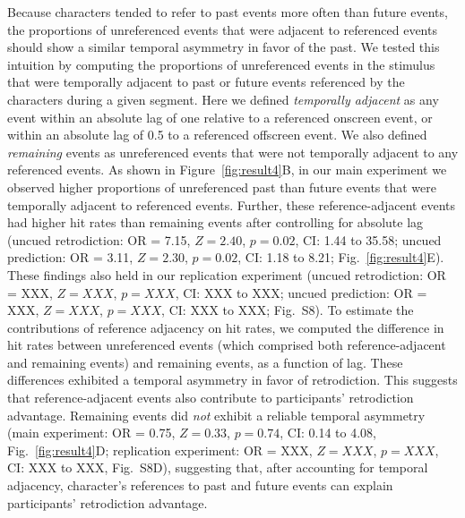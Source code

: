 \documentclass[10pt]{article}
\newcommand{\refAdjacent}{S8}
\begin{document}
Because characters tended to refer to past events more often than future events, the proportions of unreferenced events that were adjacent to referenced events should show a similar temporal asymmetry in favor of the past. We tested this intuition by computing the proportions of unreferenced events in the stimulus that were temporally adjacent to past or future events referenced by the characters during a given segment. Here we defined \textit{temporally adjacent} as any event within an absolute lag of one relative to a referenced onscreen event, or within an absolute lag of 0.5 to a referenced offscreen event. We also defined \textit{remaining} events as unreferenced events that were not temporally adjacent to any referenced events. As shown in Figure~\ref{fig:result4}B, in our main experiment we observed higher proportions of unreferenced past than future events that were temporally adjacent to referenced events. Further, these reference-adjacent events had higher hit rates than remaining events after controlling for absolute lag (uncued retrodiction: OR = 7.15, $Z = 2.40$, $p = 0.02$, CI: 1.44 to 35.58; uncued prediction: OR = 3.11, $Z = 2.30$, $p = 0.02$, CI: 1.18 to 8.21; Fig.~\ref{fig:result4}E). These findings also held in our replication experiment (uncued retrodiction: OR = XXX, $Z = XXX$, $p = XXX$, CI: XXX to XXX; uncued prediction: OR = XXX, $Z = XXX$, $p = XXX$, CI: XXX to XXX; Fig.~\refAdjacent). To estimate the contributions of reference adjacency on hit rates, we computed the difference in hit rates between unreferenced events (which comprised both reference-adjacent and remaining events) and remaining events, as a function of lag. These differences exhibited a temporal asymmetry in favor of retrodiction. This suggests that reference-adjacent events also contribute to participants' retrodiction advantage. Remaining events did \textit{not} exhibit a reliable temporal asymmetry (main experiment: OR = 0.75, $Z = 0.33$, $p = 0.74$, CI: 0.14 to 4.08, Fig.~\ref{fig:result4}D; replication experiment: OR = XXX, $Z = XXX$, $p = XXX$, CI: XXX to XXX, Fig.~\refAdjacent D), suggesting that, after accounting for temporal adjacency, character's references to past and future events can explain participants' retrodiction advantage.
\end{document}

